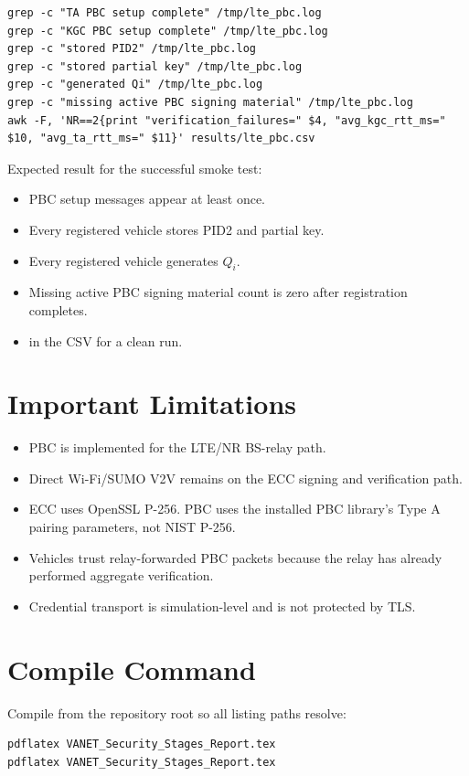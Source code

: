 \documentclass[11pt,a4paper]{article}
\newcommand{\codepath}[1]{\path{#1}}
\begin{document}
\begin{lstlisting}[style=cmdstyle,caption={Useful professor-demo checks.}]
grep -c "TA PBC setup complete" /tmp/lte_pbc.log
grep -c "KGC PBC setup complete" /tmp/lte_pbc.log
grep -c "stored PID2" /tmp/lte_pbc.log
grep -c "stored partial key" /tmp/lte_pbc.log
grep -c "generated Qi" /tmp/lte_pbc.log
grep -c "missing active PBC signing material" /tmp/lte_pbc.log
awk -F, 'NR==2{print "verification_failures=" $4, "avg_kgc_rtt_ms=" $10, "avg_ta_rtt_ms=" $11}' results/lte_pbc.csv
\end{lstlisting}

Expected result for the successful smoke test:

\begin{itemize}[leftmargin=*]
  \item PBC setup messages appear at least once.
  \item Every registered vehicle stores PID2 and partial key.
  \item Every registered vehicle generates \(Q_i\).
  \item Missing active PBC signing material count is zero after registration completes.
  \item \codepath{verification_failures=0} in the CSV for a clean run.
\end{itemize}

\section{Important Limitations}

\begin{itemize}[leftmargin=*]
  \item PBC is implemented for the LTE/NR BS-relay path.
  \item Direct Wi-Fi/SUMO V2V remains on the ECC signing and verification path.
  \item ECC uses OpenSSL P-256. PBC uses the installed PBC library's Type A pairing parameters, not NIST P-256.
  \item Vehicles trust relay-forwarded PBC packets because the relay has already performed aggregate verification.
  \item Credential transport is simulation-level and is not protected by TLS.
\end{itemize}

\section{Compile Command}

Compile from the repository root so all listing paths resolve:

\begin{lstlisting}[style=cmdstyle,caption={Build this report locally.}]
pdflatex VANET_Security_Stages_Report.tex
pdflatex VANET_Security_Stages_Report.tex
\end{lstlisting}
\end{document}
